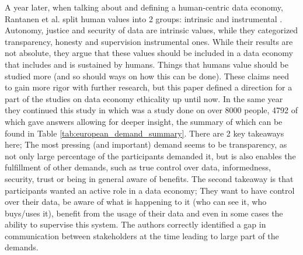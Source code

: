 \documentclass[a4paper,11pt]{report} %
\theoremstyle{change}
\theoremstyle{theoremstyle}
\begin{document}
A year later, when talking about and defining a human-centric data economy, Rantanen et al. split human values into 2 groups: intrinsic and instrumental \cite{rantanen2020ethical}. Autonomy, justice and security of data are intrinsic values, while they categorized transparency, honesty and supervision instrumental ones. While their results are not absolute, they argue that these values should be included in a data economy that includes and is sustained by humans. Things that humans value should be studied more (and so should ways on how this can be done). These claims need to gain more rigor with further research, but this paper defined a direction for a part of the studies on data economy ethicality up until now. 
In the same year they continued this study in \cite{rantanen2020humans} which was a study done on over 8000 people, 4792 of which gave answers allowing for deeper insight, the summary of which can be found in Table \ref{tab:european_demand_summary}. There are 2 key takeaways here; The most pressing (and important) demand seems to be transparency, as not only large percentage of the participants demanded it, but is also enables the fulfillment of other demands, such as true control over data, informedness, security, trust or being in general aware of benefits. The second takeaway is that participants wanted an active role in a data economy; They want to have control over their data, be aware of what is happening to it (who can see it, who buys/uses it), benefit from the usage of their data and even in some cases the ability to supervise this system. The authors correctly identified a gap in communication between stakeholders at the time leading to large part of the demands. 
\end{document}
